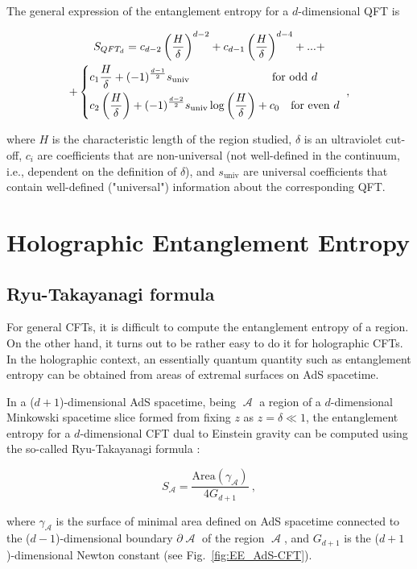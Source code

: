 \documentclass[twocolumn]{revtex4}
\providecommand{\eq}[2]{
    \begin{equation}
        #2
    \label{eq:#1}
    \end{equation}
}
\providecommand{\eqgat}[2]{
    \begin{gather}
        #2
    \label{eq:#1}
    \end{gather}
}
\DeclareMathOperator{\calA}{\mathcal{A}}
\begin{document}
The general expression of the entanglement entropy for a $d$-dimensional QFT is \cite{nishioka_entanglement_2018}
\eqgat{EE}{
    S_{QFT_d} = c_{d-2} \left( \frac{H}{\delta} \right) ^{d-2} + c_{d-1} \left( \frac{H}{\delta} \right) ^{d-4} + ... + \nonumber \\
    + \begin{dcases}
        c_1 \frac{H}{\delta} + (-1)^{\frac{d-1}{2}} s_{\text{univ}}
        \qquad \qquad \qquad \quad \ \text{for odd } d \\
        c_2 \left ( \frac{H}{\delta} \right ) + (-1)^{\frac{d-2}{2}} s_{\text{univ}} \log \left ( \frac{H}{\delta} \right ) + c_0
        \quad \text{for even } d
    \end{dcases} \ ,
}
where $H$ is the characteristic length of the region studied, $\delta$ is an ultraviolet cut-off, $c_i$ are coefficients that are non-universal (not well-defined in the continuum, i.e., dependent on the definition of $\delta$), and $s_{\text{univ}}$ are universal coefficients that contain well-defined ("universal") information about the corresponding QFT.


\section{Holographic Entanglement Entropy} \label{s:EE_Holo}


\subsection{Ryu-Takayanagi formula} \label{ss:R-T}

For general CFTs, it is difficult to compute the entanglement entropy of a region. On the other hand, it turns out to be rather easy to do it for holographic CFTs. In the holographic context, an essentially quantum quantity such as entanglement entropy can be obtained from areas of extremal surfaces on AdS spacetime.

In a ($d+1$)-dimensional AdS spacetime, being $\calA$ a region of a $d$-dimensional Minkowski spacetime slice formed from fixing $z$ as $z=\delta \ll 1$, the entanglement entropy for a $d$-dimensional CFT dual to Einstein gravity can be computed using the so-called Ryu-Takayanagi formula \cite{ryu_holographic_2008}:
\eq{EE_RT}{
    S_{\calA} = \frac{ \text{Area}(\gamma_{\calA}) }{ 4 G_{d+1} } \ ,
}
where $\gamma_{\calA}$ is the surface of minimal area defined on AdS spacetime connected to the ($d-1$)-dimensional boundary $\partial \calA$ of the region $\calA$, and $G_{d+1}$ is the ($d+1$)-dimensional Newton constant (see Fig.~\ref{fig:EE_AdS-CFT}).
\end{document}
